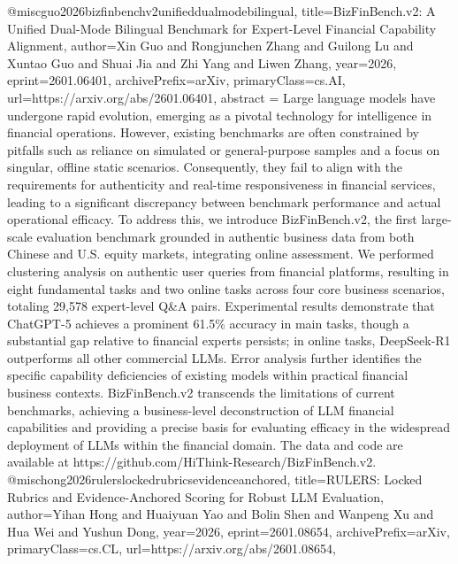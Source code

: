 {}@misc{guo2026bizfinbenchv2unifieddualmodebilingual,
      title={BizFinBench.v2: A Unified Dual-Mode Bilingual Benchmark for Expert-Level Financial Capability Alignment}, 
      author={Xin Guo and Rongjunchen Zhang and Guilong Lu and Xuntao Guo and Shuai Jia and Zhi Yang and Liwen Zhang},
      year={2026},
      eprint={2601.06401},
      archivePrefix={arXiv},
      primaryClass={cs.AI},
      url={https://arxiv.org/abs/2601.06401},
      abstract = {Large language models have undergone rapid evolution, emerging as a pivotal technology for intelligence in financial operations. However, existing benchmarks are often constrained by pitfalls such as reliance on simulated or general-purpose samples and a focus on singular, offline static scenarios. Consequently, they fail to align with the requirements for authenticity and real-time responsiveness in financial services, leading to a significant discrepancy between benchmark performance and actual operational efficacy. To address this, we introduce BizFinBench.v2, the first large-scale evaluation benchmark grounded in authentic business data from both Chinese and U.S. equity markets, integrating online assessment. We performed clustering analysis on authentic user queries from financial platforms, resulting in eight fundamental tasks and two online tasks across four core business scenarios, totaling 29,578 expert-level Q&A pairs. Experimental results demonstrate that ChatGPT-5 achieves a prominent 61.5\% accuracy in main tasks, though a substantial gap relative to financial experts persists; in online tasks, DeepSeek-R1 outperforms all other commercial LLMs. Error analysis further identifies the specific capability deficiencies of existing models within practical financial business contexts. BizFinBench.v2 transcends the limitations of current benchmarks, achieving a business-level deconstruction of LLM financial capabilities and providing a precise basis for evaluating efficacy in the widespread deployment of LLMs within the financial domain. The data and code are available at https://github.com/HiThink-Research/BizFinBench.v2.}
}@misc{hong2026rulerslockedrubricsevidenceanchored,
      title={RULERS: Locked Rubrics and Evidence-Anchored Scoring for Robust LLM Evaluation}, 
      author={Yihan Hong and Huaiyuan Yao and Bolin Shen and Wanpeng Xu and Hua Wei and Yushun Dong},
      year={2026},
      eprint={2601.08654},
      archivePrefix={arXiv},
      primaryClass={cs.CL},
      url={https://arxiv.org/abs/2601.08654},
}
